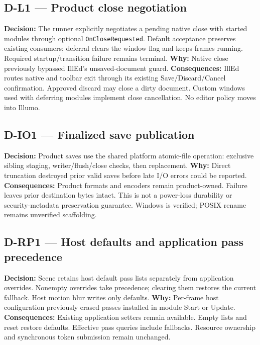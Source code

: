 \subsection*{D-L1 --- Product close negotiation}
\begin{decisionbox}[title={D-L1 \quad 2026-09-13}]
\textbf{Decision:} The runner explicitly negotiates a pending native close with
started modules through optional \texttt{OnCloseRequested}. Default acceptance
preserves existing consumers; deferral clears the window flag and keeps frames
running. Required startup/transition failure remains terminal.
\textbf{Why:} Native close previously bypassed IllEd's unsaved-document guard.
\textbf{Consequences:} IllEd routes native and toolbar exit through its existing
Save/Discard/Cancel confirmation. Approved discard may close a dirty document.
Custom windows used with deferring modules implement close cancellation. No
editor policy moves into Illumo.
\end{decisionbox}

\subsection*{D-IO1 --- Finalized save publication}
\begin{decisionbox}[title={D-IO1 \quad 2026-09-13}]
\textbf{Decision:} Product saves use the shared platform atomic-file operation:
exclusive sibling staging, writer/flush/close checks, then replacement.
\textbf{Why:} Direct truncation destroyed prior valid saves before late I/O
errors could be reported.
\textbf{Consequences:} Product formats and encoders remain product-owned.
Failure leaves prior destination bytes intact. This is not a power-loss
durability or security-metadata preservation guarantee. Windows is verified;
POSIX rename remains unverified scaffolding.
\end{decisionbox}

\subsection*{D-RP1 --- Host defaults and application pass precedence}
\begin{decisionbox}[title={D-RP1 \quad 2026-09-13}]
\textbf{Decision:} Scene retains host default pass lists separately from
application overrides. Nonempty overrides take precedence; clearing them
restores the current fallback. Host motion blur writes only defaults.
\textbf{Why:} Per-frame host configuration previously erased passes installed
in module Start or Update.
\textbf{Consequences:} Existing application setters remain available. Empty
lists and reset restore defaults. Effective pass queries include fallbacks.
Resource ownership and synchronous token submission remain unchanged.
\end{decisionbox}

